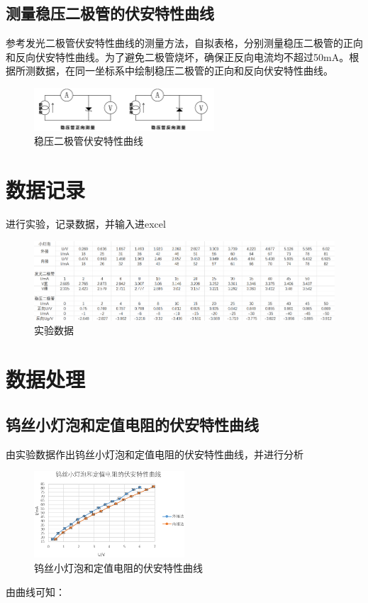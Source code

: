 \documentclass[12pt,a4paper]{article}
\begin{document}
		\subsection{测量稳压二极管的伏安特性曲线}
		参考发光二极管伏安特性曲线的测量方法，自拟表格，分别测量稳压二极管的正向和反向伏安特性曲线。为了避免二极管烧坏，确保正反向电流均不超过50mA。根据所测数据，在同一坐标系中绘制稳压二极管的正向和反向伏安特性曲线。
			\begin{figure}[htbp]
				\centering
				\includegraphics[width=0.6\textwidth]{稳压二极管.png} %
				\caption{稳压二极管伏安特性曲线}
				\label{fig:example}
		  	\end{figure}

	\section{数据记录}
		进行实验，记录数据，并输入进excel
		\begin{figure}[htbp]
			\centering
			\includegraphics[width=1\textwidth]{数据处理.png} %
			\caption{实验数据}
			\label{fig:example}
		  \end{figure}

	\section{数据处理}
		\subsection{钨丝小灯泡和定值电阻的伏安特性曲线}
			由实验数据作出钨丝小灯泡和定值电阻的伏安特性曲线，并进行分析
			\begin{figure}[H]
				\centering
					\includegraphics[width=0.5\textwidth]{小灯泡.png} %
				\caption{钨丝小灯泡和定值电阻的伏安特性曲线}
				\label{fig:example}
		  	\end{figure}
			由曲线可知：
\end{document}
